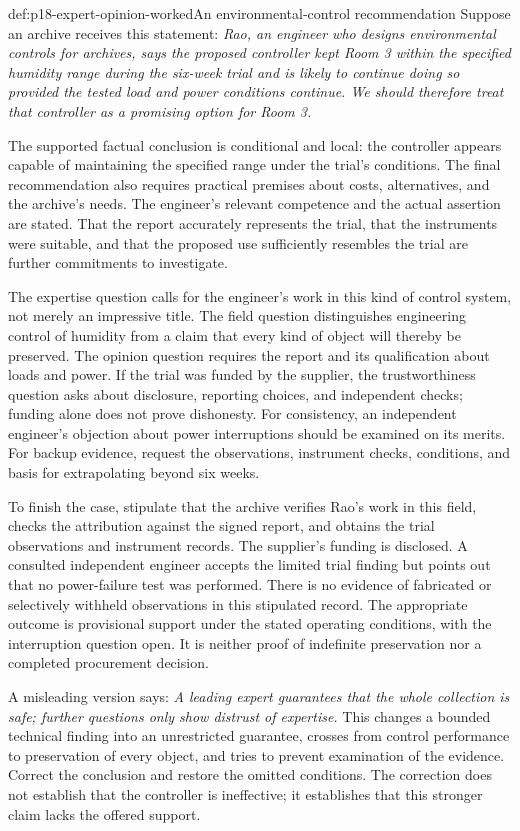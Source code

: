 \begin{hbexample}{def:p18-expert-opinion-worked}{An environmental-control recommendation}
Suppose an archive receives this statement:
\emph{Rao, an engineer who designs environmental controls for archives,
says the proposed controller kept Room 3 within the specified humidity
range during the six-week trial and is likely to continue doing so
provided the tested load and power conditions continue.
We should therefore treat that controller as a
promising option for Room 3.}

The supported factual conclusion is conditional and local: the controller
appears capable of maintaining the specified range under the trial's
conditions. The final recommendation also requires practical premises
about costs, alternatives, and the archive's needs.
The engineer's relevant competence and the actual assertion are stated.
That the report accurately represents the trial, that the instruments
were suitable, and that the proposed use sufficiently resembles the trial
are further commitments to investigate.

The expertise question calls for the engineer's work in this kind of
control system, not merely an impressive title. The field question
distinguishes engineering control of humidity from a claim that every
kind of object will thereby be preserved. The opinion question requires
the report and its qualification about loads and power.
If the trial was funded by the supplier, the trustworthiness question
asks about disclosure, reporting choices, and independent checks; funding
alone does not prove dishonesty. For consistency, an independent engineer's
objection about power interruptions should be examined on its merits.
For backup evidence, request the observations, instrument checks,
conditions, and basis for extrapolating beyond six weeks.

To finish the case, stipulate that the archive verifies Rao's work in
this field, checks the attribution against the signed report, and obtains
the trial observations and instrument records. The supplier's funding
is disclosed. A consulted independent engineer accepts the limited trial
finding but points out that no power-failure test was performed.
There is no evidence of fabricated or selectively withheld observations
in this stipulated record.
The appropriate outcome is provisional support
under the stated operating conditions, with the interruption question open.
It is neither proof of indefinite preservation nor a completed procurement
decision.

A misleading version says:
\emph{A leading expert guarantees that the whole collection is safe;
further questions only show distrust of expertise.}
This changes a bounded technical finding into an unrestricted guarantee,
crosses from control performance to preservation of every object, and
tries to prevent examination of the evidence. Correct the conclusion
and restore the omitted conditions. The correction does not establish
that the controller is ineffective; it establishes that this stronger
claim lacks the offered support.
\end{hbexample}

